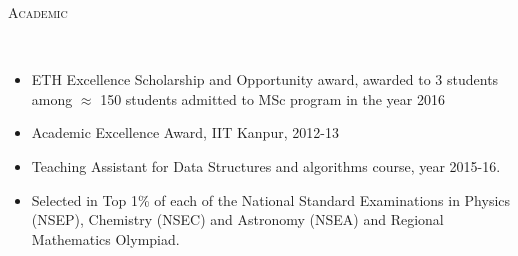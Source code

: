 \documentclass[9pt]{article}
\newenvironment{changemargin}[2]{%
  \begin{list}{}{%
    \setlength{\topsep}{0pt}%
    \setlength{\leftmargin}{#1}%
    \setlength{\rightmargin}{#2}%
    \setlength{\listparindent}{\parindent}%
    \setlength{\itemindent}{\parindent}%
    \setlength{\parsep}{\parskip}%
  }%
  \item[]}{\end{list}
}
\newcommand{\lineover}{
	\begin{changemargin}{-0.05in}{-0.10in}
		\vspace*{-9pt}
		\hrulefill \\
		\vspace*{-2pt}
	\end{changemargin}
}
\newcommand{\header}[1]{
	\begin{changemargin}{-0.5in}{-0.5in}
		\scshape{#1}\\
  	\lineover
	\end{changemargin}
}
\newenvironment{body} {
	\vspace*{-16pt}
	\begin{changemargin}{-0.6in}{-0.65in}
  }	
	{\end{changemargin}
}
\begin{document}
\header{Academic}
\begin{body}
	\vspace{14pt}
	\begin{changemargin}{0.15in}{0.15in}
	\begin{itemize}
	  \item ETH Excellence Scholarship and Opportunity award, awarded to 3 students among $\approx$ 150 students
            admitted to MSc program in the year 2016
	  \item Academic Excellence Award, IIT Kanpur, 2012-13 
	  \item Teaching Assistant for Data Structures and algorithms course, year 2015-16.
	  \item Selected in Top 1\% of each of the National Standard Examinations in Physics (NSEP), Chemistry (NSEC) and Astronomy (NSEA) and Regional Mathematics Olympiad.
	\end{itemize}
	\end{changemargin}
\end{body}


% 
\end{document}
